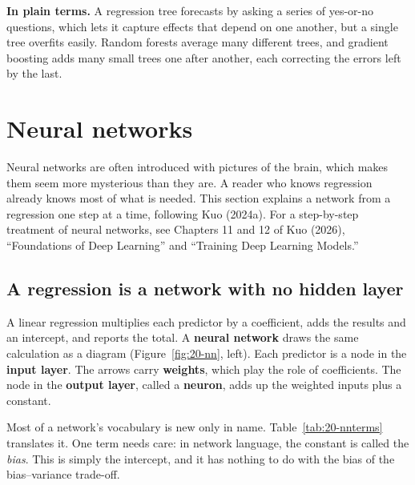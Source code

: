 \noindent\textbf{In plain terms.} A regression tree forecasts by asking a series of yes-or-no questions, which lets it capture effects that depend on one another, but a single tree overfits easily. Random forests average many different trees, and gradient boosting adds many small trees one after another, each correcting the errors left by the last.

\section{Neural networks}
\label{sec:20-nn}

Neural networks are often introduced with pictures of the brain, which makes them seem more mysterious than they are. A reader who knows regression already knows most of what is needed. This section explains a network from a regression one step at a time, following Kuo (2024a). For a step-by-step treatment of neural networks, see Chapters 11 and 12 of Kuo (2026), ``Foundations of Deep Learning'' and ``Training Deep Learning Models.''

\subsection{A regression is a network with no hidden layer}

A linear regression multiplies each predictor by a coefficient, adds the results and an intercept, and reports the total. A \textbf{neural network} draws the same calculation as a diagram (Figure~\ref{fig:20-nn}, left). Each predictor is a node in the \textbf{input layer}. The arrows carry \textbf{weights}, which play the role of coefficients. The node in the \textbf{output layer}, called a \textbf{neuron}, adds up the weighted inputs plus a constant.

Most of a network's vocabulary is new only in name. Table~\ref{tab:20-nnterms} translates it. One term needs care: in network language, the constant is called the \emph{bias}. This is simply the intercept, and it has nothing to do with the bias of the bias--variance trade-off.

